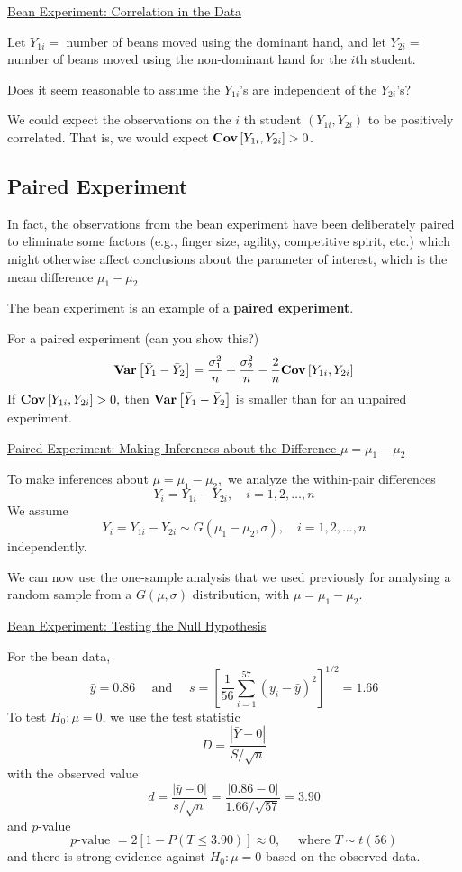 \underline{Bean Experiment: Correlation in the Data}

Let $ Y_{1i}= $ number of beans moved using the dominant hand, and let $ Y_{2i}= $
number of beans moved using the non-dominant hand for the $ i $th student.

Does it seem reasonable to assume the $ Y_{1i} $'s are independent of the $ Y_{2i} $'s?

We could expect the observations on the $i$ th student
$\left(Y_{1 i}, Y_{2 i}\right)$ to be positively correlated.
That is, we would expect $\bm{\mathrm{Cov}}\left[Y_{1 i}, Y_{2 i}\right]>0$.

\subsection{Paired Experiment}
In fact, the observations from the bean experiment have been deliberately paired to eliminate some factors
(e.g., finger size, agility, competitive spirit, etc.) which might otherwise affect conclusions about the parameter of interest, which is the mean difference $\mu_{1}-\mu_{2}$

The bean experiment is an example of a \textbf{paired experiment}.

For a paired experiment (can you show this?)
\[ \bm{\mathrm{Var}}\left[\bar{Y}_{1}-\bar{Y}_{2}\right]
    =\frac{\sigma_{1}^{2}}{n}+\frac{\sigma_{2}^{2}}{n}-\frac{2}{n} \bm{\mathrm{Cov}}\left[Y_{1 i}, Y_{2 i}\right] \]
If
$\bm{\mathrm{Cov}}\left[Y_{1 i}, Y_{2 i}\right]>0,$
then $\bm{\mathrm{Var}}\left[\bar{Y}_{1}-\bar{Y}_{2}\right]$ is smaller than for an unpaired experiment.

\underline{Paired Experiment: Making Inferences about the Difference $ \mu=\mu_1-\mu_2 $}

To make inferences about $\mu=\mu_{1}-\mu_{2},$ we analyze the within-pair differences
\[Y_{i}=Y_{1 i}-Y_{2 i}, \quad i=1,2, \ldots, n\]
We assume
\[ Y_{i}=Y_{1 i}-Y_{2 i} \sim G\left(\mu_{1}-\mu_{2}, \sigma\right), \quad i=1,2, \ldots, n \]
independently.

We can now use the one-sample analysis that we used previously for analysing
a random sample from a $G(\mu, \sigma)$ distribution, with $\mu=\mu_{1}-\mu_{2}$.

\underline{Bean Experiment: Testing the Null Hypothesis}

For the bean data,
\[ \bar{y}=0.86 \quad \text { and } \quad s=\left[\frac{1}{56} \sum_{i=1}^{57}\left(y_{i}-\bar{y}\right)^{2}\right]^{1 / 2}=1.66 \]
To test $ H_0:\mu=0 $, we use the test statistic
\[D=\frac{|\bar{Y}-0|}{S / \sqrt{n}}\]
with the observed value
\[d=\frac{|\bar{y}-0|}{s / \sqrt{n}}=\frac{|0.86-0|}{1.66 / \sqrt{57}}=3.90\]
and $p$-value
\[p \text {-value }=2[1-P(T \leq 3.90)] \approx 0, \quad \text { where } T \sim t(56)\]
and there is strong evidence against $H_{0}: \mu=0$ based on the observed data.

